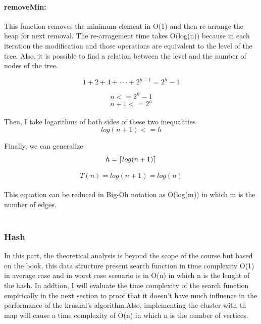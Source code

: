 \documentclass{article}
\DeclarePairedDelimiter\ceil{\lceil}{\rceil}
\begin{document}
\paragraph{removeMin:}This function removes the minimum element in O(1) and then re-arrange the heap for next removal. The re-arragement time takes O(log(n)) because in each iteration the modification and those operations are equivalent to the level of the tree. Also, it is possible to find a relation between the level and the number of nodes of the tree.

$$ 1+2+4+···+ 2^{h-1}= 2^{h} −1 $$

$$ n <= 2^{h} −1 $$
$$ n + 1 <= 2^{h}  $$\\

Then, I take logarithms of both sides of these two inequalities\\

$$ log(n + 1) <= h $$

Finally, we can generalize\\

$$ h = \ceil{log(n + 1)} $$

$$T(n) = log(n + 1) = log(n) $$\\

This equation can be reduced in Big-Oh notation as O(log(m)) in which m is the number of edges.\\\\

\subsubsection{Hash}
In this part, the theoretical analysis is beyond the scope of the course but based on the book, this data structure present search function in time complexity O(1) in average case and in worst case scenario is in O(n) in which n is the lenght of the hash. In addtion, I will evaluate the time complexity of the search function empirically in the next section to proof that it doesn't have much influence in the performance of the kruskal's algorithm.Also, implementing the cluster with th map will cause a time complexity of O(n) in which n is the number of vertices.\\\\
\end{document}

